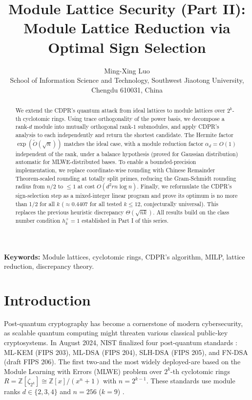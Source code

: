 \documentclass[11pt,a4paper]{article}
\title{Module Lattice Security (Part II): \\
{\large Module Lattice Reduction via Optimal Sign Selection}}
\author{Ming-Xing Luo
\\
\footnotesize
School of Information Science and Technology, Southwest Jiaotong University, Chengdu 610031, China}
\theoremstyle{plain}
\theoremstyle{definition}
\theoremstyle{remark}
\newcommand{\Z}{\mathbb{Z}}
\begin{document}
\maketitle

\begin{abstract}
We extend the CDPR's quantum attack from ideal lattices to module lattices over $2^k$-th cyclotomic rings. Using trace orthogonality of the power basis, we decompose a rank-$d$ module into mutually orthogonal rank-$1$ submodules, and apply CDPR's analysis to each independently and return the shortest candidate. The Hermite factor $\exp(\tilde{O}(\sqrt{n}))$ matches the ideal case, with a module reduction factor $\alpha_d=O(1)$ independent of the rank, under a balance hypothesis (proved for Gaussian distribution) automatic for MLWE-distributed bases. To enable a bounded-precision implementation, we replace coordinate-wise rounding with Chinese Remainder Theorem-scaled rounding at totally split primes, reducing the Gram-Schmidt rounding radius from $n/2$ to $\le 1$ at cost $O(d^2 r n \log n)$. Finally, we reformulate the CDPR's sign-selection step as a mixed-integer linear program and prove its optimum is no more than 1/2 for all $k$ ($\approx 0.4407$ for all tested $k\le 12$, conjecturally universal). This replaces the previous heuristic discrepancy $\Theta(\sqrt{nk})$. All results build on the class number condition $h_k^+=1$ established in Part I of this series.
\end{abstract}


\medskip
\noindent\textbf{Keywords:}
Module lattices, cyclotomic rings, CDPR's algorithm, MILP, lattice reduction, discrepancy theory.

\section{Introduction}\label{Sec-intro}

Post-quantum cryptography has become a cornerstone of modern cybersecurity, as scalable quantum computing might threaten various classical public-key cryptosystems. In August 2024, NIST finalized four post-quantum standards \cite{NIST-MLKEM,NIST-MLDSA,NIST-SLHDSA}: ML-KEM (FIPS 203), ML-DSA (FIPS 204), SLH-DSA (FIPS 205), and FN-DSA (draft FIPS 206). The first two-and the most widely deployed-are based on the Module Learning with Errors (MLWE) problem \cite{LS15,ADPS16,DKL+18} over $2^k$-th cyclotomic rings $R=\Z[\zeta_{2^k}] \cong \Z[x]/(x^n+1)$ with $n=2^{k-1}$. These standards use module ranks $d\in\{2,3,4\}$ and $n=256$ ($k=9$) \cite{NIST-MLKEM}.
\end{document}
